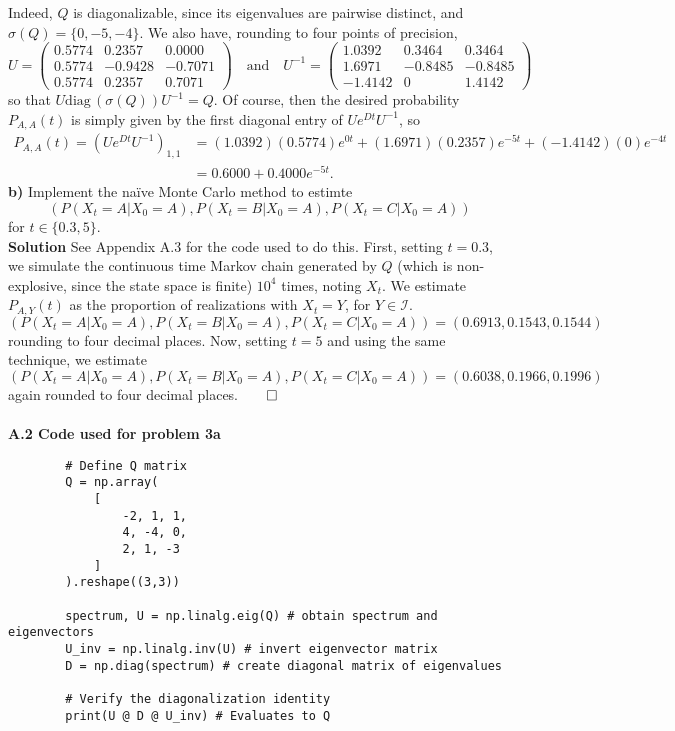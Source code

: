 \documentclass[11pt, letterpaper]{article}
\newcommand{\mc}[1]{\mathcal{#1}}
\begin{document}
    Indeed, $Q$ is diagonalizable, since its eigenvalues are pairwise distinct, and $\sigma(Q)=\{0, -5, -4\}$. We also have, rounding to four points of precision,
    \[U=\begin{pmatrix}
        0.5774 & 0.2357 & 0.0000\\
        0.5774 & -0.9428 & -0.7071\\
        0.5774 &   0.2357 & 0.7071
    \end{pmatrix}\quad\text{and}\quad U^{-1}=\begin{pmatrix}
        1.0392 & 0.3464 & 0.3464\\
        1.6971 & -0.8485 & -0.8485\\
        -1.4142 & 0 & 1.4142
    \end{pmatrix}\]
    so that $U\text{diag}\,(\sigma(Q))U^{-1}=Q$. Of course, then the desired probability $P_{A,A}(t)$ is simply given by the first diagonal entry of $Ue^{Dt}U^{-1}$, so
    \begin{align*}
        P_{A,A}(t)=(Ue^{Dt}U^{-1})_{1,1}&=(1.0392)(0.5774)e^{0t}+(1.6971)(0.2357)e^{-5t}+(-1.4142)(0)e^{-4t}\\
        &=0.6000+0.4000e^{-5t}.\tag*{$\qed$}
    \end{align*}
    {\bf b)} Implement the na\"ive Monte Carlo method to estimte 
    \[(P(X_t=A|X_0=A), P(X_t=B|X_0=A), P(X_t=C|X_0=A))\]
    for $t\in\{0.3, 5\}$.\\[10pt]
    {\bf Solution} See Appendix A.3 for the code used to do this. First, setting $t=0.3$, we simulate the continuous time Markov chain
    generated by $Q$ (which is non-explosive, since the state space is finite) $10^4$ times, noting $X_t$. We estimate $P_{A,Y}(t)$ as the proportion
    of realizations with $X_t=Y$, for $Y\in\mc{I}$.
    \[(P(X_t=A|X_0=A), P(X_t=B|X_0=A), P(X_t=C|X_0=A))=(0.6913, 0.1543, 0.1544)\]
    rounding to four decimal places. Now, setting $t=5$ and using the same technique, we estimate
    \[(P(X_t=A|X_0=A), P(X_t=B|X_0=A), P(X_t=C|X_0=A))=(0.6038, 0.1966, 0.1996)\]
    again rounded to four decimal places.\hfill{$\qed$}\\[10pt]
    \\[10pt]
    {\bf A.2 Code used for problem 3a}
    \begin{verbatim}
        # Define Q matrix
        Q = np.array(
            [
                -2, 1, 1,
                4, -4, 0,
                2, 1, -3
            ]
        ).reshape((3,3))

        spectrum, U = np.linalg.eig(Q) # obtain spectrum and eigenvectors
        U_inv = np.linalg.inv(U) # invert eigenvector matrix
        D = np.diag(spectrum) # create diagonal matrix of eigenvalues

        # Verify the diagonalization identity
        print(U @ D @ U_inv) # Evaluates to Q
    \end{verbatim}
\end{document}
